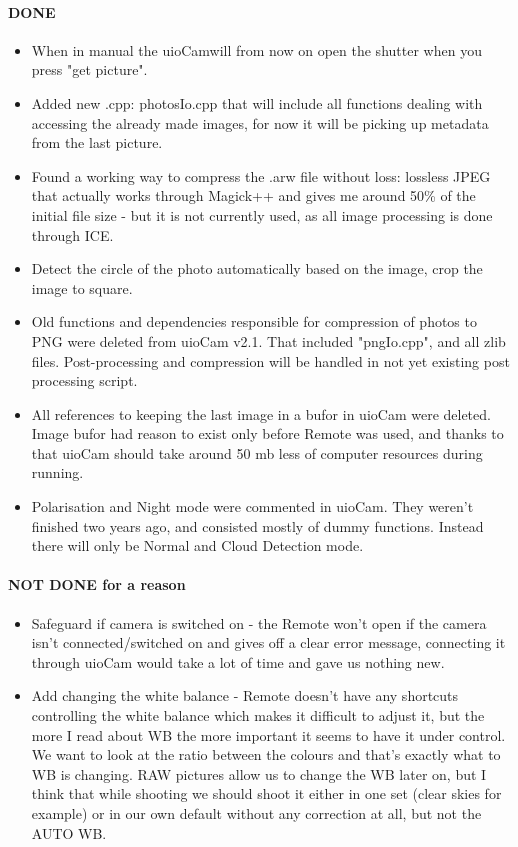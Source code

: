 \documentclass[]{book}
\begin{document}
	\paragraph{DONE}
	\begin{itemize}
		\item When in manual the uioCamwill from now on open the shutter when you press "get picture".
		\item Added new .cpp: photosIo.cpp that will include all functions dealing with accessing the already made images, for now it will be picking up metadata from the last picture.
		\item Found a working way to compress the .arw file without loss: lossless JPEG that actually works through Magick++ and gives me around 50\% of the initial file size - but it is not currently used, as all image processing is done through ICE.
		\item Detect the circle of the photo automatically based on the image, crop the image to square.
		\item Old functions and dependencies responsible for compression of photos to PNG were deleted from uioCam v2.1. That included "pngIo.cpp", and all zlib files. Post-processing and compression will be handled in not yet existing post processing script.
		\item All references to keeping the last image in a bufor in uioCam were deleted. Image bufor had reason to exist only before Remote was used, and thanks to that uioCam should take around 50 mb less of computer resources during running.
		\item Polarisation and Night mode were commented in uioCam. They weren't finished two years ago, and consisted mostly of dummy functions. Instead there will only be Normal and Cloud Detection mode.
	\end{itemize}

	\paragraph{NOT DONE for a reason}
	\begin{itemize}
		\item Safeguard if camera is switched on - the Remote won't open if the camera isn't connected/switched on and gives off a clear error message, connecting it through uioCam would take a lot of time and gave us nothing new.
		\item Add changing the white balance - Remote doesn't have any shortcuts controlling the white balance which makes it difficult to adjust it, but the more I read about WB the more important it seems to have it under control. We want to look at the ratio between the colours and that's exactly what to WB is changing. RAW pictures allow us to change the WB later on, but I think that while shooting we should shoot it either in one set (clear skies for example) or in our own default without any correction at all, but not the AUTO WB.
	\end{itemize}
\end{document}
